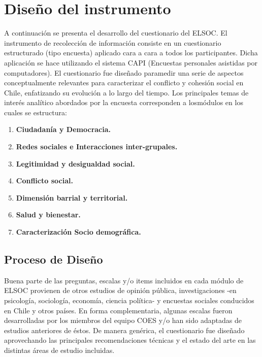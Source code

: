 \documentclass[
]{book}
\providecommand{\tightlist}{%
  \setlength{\itemsep}{0pt}\setlength{\parskip}{0pt}}
\begin{document}
\hypertarget{dis_ins}{%
\chapter{Diseño del instrumento}\label{dis_ins}}

A continuación se presenta el desarrollo del cuestionario del ELSOC. El
instrumento de recolección de información consiste en un cuestionario
estructurado (tipo encuesta) aplicado cara a cara a todos los
participantes. Dicha aplicación se hace utilizando el sistema CAPI
(Encuestas personales asistidas por computadores). El cuestionario fue
diseñado paramedir una serie de aspectos conceptualmente relevantes para
caracterizar el conflicto y cohesión social en Chile, enfatizando su
evolución a lo largo del tiempo. Los principales temas de interés
analítico abordados por la encuesta corresponden a losmódulos en los
cuales se estructura:

\begin{enumerate}
\def\labelenumi{\arabic{enumi}.}
\tightlist
\item
  \textbf{Ciudadanía y Democracia.}
\item
  \textbf{Redes sociales e Interacciones inter-grupales.}
\item
  \textbf{Legitimidad y desigualdad social.}
\item
  \textbf{Conflicto social.}
\item
  \textbf{Dimensión barrial y territorial.}
\item
  \textbf{Salud y bienestar.}
\item
  \textbf{Caracterización Socio demográfica.}
\end{enumerate}

\hypertarget{proceso-de-diseuxf1o}{%
\section{Proceso de Diseño}\label{proceso-de-diseuxf1o}}

Buena parte de las preguntas, escalas y/o items incluidos en cada módulo
de ELSOC provienen de otros estudios de opinión pública, investigaciones
-en psicología, sociología, economía, ciencia política- y encuestas
sociales conducidos en Chile y otros países. En forma complementaria,
algunas escalas fueron desarrolladas por los miembros del equipo COES
y/o han sido adaptadas de estudios anteriores de éstos. De manera
genérica, el cuestionario fue diseñado aprovechando las principales
recomendaciones técnicas y el estado del arte en las distintas áreas de
estudio incluidas.
\end{document}
